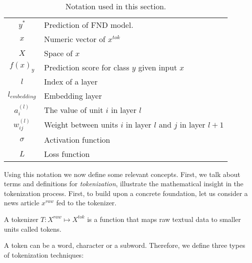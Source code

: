 \begin{table}
\begin{tabular}{cp{}}
        $y^*$           & Prediction of FND model.                                       \\
        $x$             & Numeric vector of $x^{tok}$                                    \\
        $X$             & Space of $x$                                                   \\
        $f(x)_y$        & Prediction score for class $y$ given input $x$                 \\
        $l$             & Index of a layer                                               \\
        $l_{embedding}$ & Embedding layer                                                \\
        $a_{i}^{(l)}$   & The value of unit $i$ in layer $l$                             \\
        $w_{ij}^{(l)}$  & Weight between units $i$ in layer $l$ and $j$ in layer $l+1$   \\
        $\sigma$        & Activation function                                            \\
        $L$             & Loss function                                                  \\
    \end{tabular}
    \caption[Notation]{Notation used in this section.}
    \label{tab:newsContentModels_Notation}
\end{table}
Using this notation we now define some relevant concepts. First, we talk about terms and definitions for \emph{tokenization}, illustrate the mathematical insight in the tokenization process. First, to build upon a concrete foundation, let us consider a news article $x^{raw}$ fed to the tokenizer.
\begin{definition}
    A tokenizer $T:X^{raw} \mapsto X^{tok}$ is a function that maps raw textual data to smaller units called tokens.
\end{definition}
A token can be a word, character or a subword. Therefore, we define three types of tokenization techniques:
